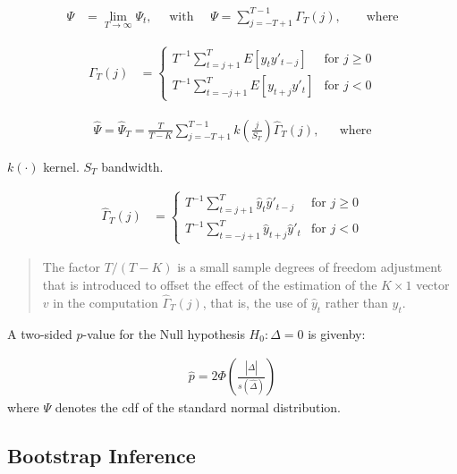 \documentclass[12pt,oneside,a4paper]{article}
\begin{document}
\begin{align*}
	\Psi &= \lim_{T \to \infty} \Psi_{t},
	\quad \text{ with } \quad
	\Psi = \sum_{j=-T+1}^{T-1} \Gamma_{T}(j),
	\qquad \text{where}
\end{align*}

\begin{align*}
	\Gamma_{T}(j) &=
\begin{cases}
	T^{-1} \sum_{t=j+1}^{T}	E[y_{t}y'_{t-j}] & \text{for } j \geq 0
	\\
	T^{-1} \sum_{t=-j+1}^{T} E[y_{t+j}y'_{t}]& \text{for } j<0
\end{cases}
\end{align*}

\begin{align*}
	\hat{\Psi} = \hat{\Psi}_{T} =
	\frac{T}{T-K}
	\sum_{j=-T+1}^{T-1}
	k\left( \frac{j}{S_{T}} \right) \hat{\Gamma}_{T}(j), && \text{where}
\end{align*}

$k(\cdot)$ kernel.
$S_{T}$ bandwidth.

\begin{align*}
	\hat{\Gamma}_{T}(j) &=
\begin{cases}
	T^{-1} \sum_{t=j+1}^{T}	\hat{y}_{t} \hat{y}'_{t-j} & \text{for } j \geq 0
	\\
	T^{-1} \sum_{t=-j+1}^{T} \hat{y}_{t+j} \hat{y}'_{t}& \text{for } j<0
\end{cases}
\end{align*}

\begin{quote}
{\footnotesize
The factor $T/(T-K)$ is a small sample degrees of freedom adjustment that is introduced to offset the effect of the estimation of the $K \times 1$ vector $v$ in the computation $\hat{\Gamma}_{T}(j)$, that is, the use of $\hat{y}_{t}$ rather than $y_{t}$.}
\end{quote}

A two-sided $p$-value for the Null hypothesis $H_{0}: \Delta=0$ is givenby:

\begin{align*}
	\hat{p} = 2 \Phi\left( \frac{|\hat{\Delta}|}{s(\hat{\Delta})} \right)
\end{align*}
where $\Psi$ denotes the cdf of the standard normal distribution.

\subsection{Bootstrap Inference}
\end{document}
